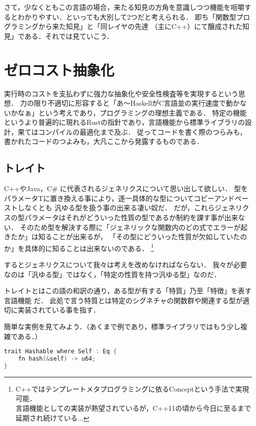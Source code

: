 さて，少なくともこの言語の場合，来たる知見の方角を意識しつつ機能を咀嚼するとわかりやすい．といっても大別して2つだと考えられる．
即ち「関数型プログラミングから来た知見」と「同レイヤの先達 （主にC++）にて醸成された知見」である．それでは見ていこう．

\section{ゼロコスト抽象化}
実行時のコストを支払わずに強力な抽象化や安全性検査等を実現するという思想．
力の限り不適切に形容すると「あ〜HaskellがC言語並の実行速度で動かないかなぁ」という考えであり，プログラミングの理想主義である．
特定の機能というより普遍的に現れるRustの指針であり，言語機能から標準ライブラリの設計，果てはコンパイルの最適化まで及ぶ．
従ってコードを書く際のつらみも，書かれたコードのつよみも，大凡ここから発露するものである．

\subsection{トレイト}
C++やJava，C\# に代表されるジェネリクスについて思い出して欲しい．
型をパラメータTに置き換える事により，逐一具体的な型についてコピーアンドペーストしなくとも
汎ゆる型を扱う事の出来る凄い奴だ．
だが，これらジェネリクスの型パラメータはそれがどういった性質の型であるか制約を課す事が出来ない．
そのため型を解決する際に「ジェネリックな関数内のどの式でエラーが起きたか」は知ることが出来るが，
「その型にどういった性質が欠如していたのか」を具体的に知ることは出来ないのである．
\footnote{C++ではテンプレートメタプログラミングに依るConceptという手法で実現可能．
  \\ 言語機能としての実装が熱望されているが，C++11の頃から今日に至るまで延期され続けている...}

するとジェネリクスについて我々は考えを改めなければならない．
我々が必要なのは「汎ゆる型」ではなく，「特定の性質を持つ汎ゆる型」なのだ．

トレイトとはこの語の和訳の通り，ある型が有する「特質」乃至「特徴」を表す言語機能
だ．
此処で言う特質とは特定のシグネチャの関数群や関連する型が適切に実装されている事を指す．

簡単な実例を見てみよう．（あくまで例であり，標準ライブラリではもう少し複
雑である．）

\begin{lstlisting}[language={C++},caption=Hash可能である事を示すトレイト,label=hash_t]
trait Hashable where Self : Eq {
    fn hash(&self) -> u64;
}
\end{lstlisting}

